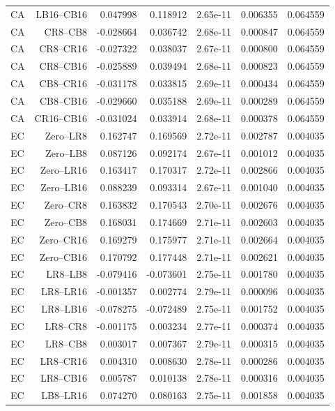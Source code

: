 {\begin{longtable}{lrrrrrr}
CA & LB16--CB16 & 0.047998 & 0.118912 & 2.65e-11 & 0.006355 & 0.064559 \\
CA & CR8--CB8 & -0.028664 & 0.036742 & 2.68e-11 & 0.000847 & 0.064559 \\
CA & CR8--CR16 & -0.027322 & 0.038037 & 2.67e-11 & 0.000800 & 0.064559 \\
CA & CR8--CB16 & -0.025889 & 0.039494 & 2.68e-11 & 0.000823 & 0.064559 \\
CA & CB8--CR16 & -0.031178 & 0.033815 & 2.69e-11 & 0.000434 & 0.064559 \\
CA & CB8--CB16 & -0.029660 & 0.035188 & 2.69e-11 & 0.000289 & 0.064559 \\
CA & CR16--CB16 & -0.031024 & 0.033914 & 2.68e-11 & 0.000378 & 0.064559 \\
EC & Zero--LR8 & 0.162747 & 0.169569 & 2.72e-11 & 0.002787 & 0.004035 \\
EC & Zero--LB8 & 0.087126 & 0.092174 & 2.67e-11 & 0.001012 & 0.004035 \\
EC & Zero--LR16 & 0.163417 & 0.170317 & 2.72e-11 & 0.002866 & 0.004035 \\
EC & Zero--LB16 & 0.088239 & 0.093314 & 2.67e-11 & 0.001040 & 0.004035 \\
EC & Zero--CR8 & 0.163832 & 0.170543 & 2.70e-11 & 0.002676 & 0.004035 \\
EC & Zero--CB8 & 0.168031 & 0.174669 & 2.71e-11 & 0.002603 & 0.004035 \\
EC & Zero--CR16 & 0.169279 & 0.175977 & 2.71e-11 & 0.002664 & 0.004035 \\
EC & Zero--CB16 & 0.170792 & 0.177448 & 2.71e-11 & 0.002621 & 0.004035 \\
EC & LR8--LB8 & -0.079416 & -0.073601 & 2.75e-11 & 0.001780 & 0.004035 \\
EC & LR8--LR16 & -0.001357 & 0.002774 & 2.79e-11 & 0.000096 & 0.004035 \\
EC & LR8--LB16 & -0.078275 & -0.072489 & 2.75e-11 & 0.001752 & 0.004035 \\
EC & LR8--CR8 & -0.001175 & 0.003234 & 2.77e-11 & 0.000374 & 0.004035 \\
EC & LR8--CB8 & 0.003017 & 0.007367 & 2.79e-11 & 0.000315 & 0.004035 \\
EC & LR8--CR16 & 0.004310 & 0.008630 & 2.78e-11 & 0.000286 & 0.004035 \\
EC & LR8--CB16 & 0.005787 & 0.010138 & 2.78e-11 & 0.000316 & 0.004035 \\
EC & LB8--LR16 & 0.074270 & 0.080163 & 2.75e-11 & 0.001858 & 0.004035 \\

\end{longtable}}

